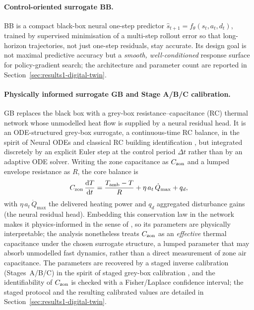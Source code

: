 \paragraph{Control-oriented surrogate BB.}
BB is a compact black-box neural one-step predictor
$\hat{s}_{t+1}=f_\theta(s_t,a_t,d_t)$, trained by supervised minimisation of a
multi-step rollout error so that long-horizon trajectories, not just one-step
residuals, stay accurate. Its design goal is not maximal predictive accuracy but
a \emph{smooth, well-conditioned} response surface for policy-gradient search; the
architecture and parameter count are reported in Section~\ref{sec:results1-digital-twin}.

\paragraph{Physically informed surrogate GB and Stage A/B/C calibration.}
GB replaces the black box with a grey-box resistance--capacitance (RC) thermal
network whose unmodelled heat flow is supplied by a neural residual head. It is an
ODE-structured grey-box surrogate, a continuous-time RC balance, in the spirit
of Neural ODEs \citep{Chen2018NeuralODE} and classical RC building identification
\citep{Bunning2020RC,Berthou2014RC,Bacher2011RCIdentification,Picard2017WhiteBox},
but integrated discretely by an explicit Euler step at the control period
$\Delta t$ rather than by an adaptive ODE solver. Writing the zone capacitance as
$C_{\mathrm{zon}}$ and a lumped envelope resistance as $R$, the core balance is
\begin{equation*}
C_{\mathrm{zon}}\,\frac{\mathrm{d}T}{\mathrm{d}t}
= \frac{T_{\mathrm{amb}}-T}{R} + \eta\,a_t\,\dot{Q}_{\max} + q_d,
\end{equation*}
with $\eta\,a_t\,\dot{Q}_{\max}$ the delivered heating power and $q_d$ aggregated
disturbance gains (the neural residual head). Embedding this conservation law in the
network makes it physics-informed in the sense of
\citet{Raissi2019PINN,Karpatne2017TheoryGuided,Willard2022PIML}, so its parameters
are physically interpretable; the analysis nonetheless treats $C_{\mathrm{zon}}$ as an \emph{effective}
thermal capacitance under the chosen surrogate structure, a lumped parameter
that may absorb unmodelled fast dynamics, rather than a direct measurement of
zone air capacitance. The parameters are recovered by a staged inverse calibration
(Stages~A/B/C) in the spirit of staged grey-box calibration
\citep{Bacher2011RCIdentification}, and the identifiability of $C_{\mathrm{zon}}$ is checked
with a Fisher/Laplace confidence interval; the staged protocol and the resulting
calibrated values are detailed in Section~\ref{sec:results1-digital-twin}.


